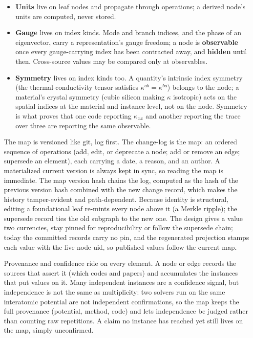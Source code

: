 \documentclass[11pt,a4paper]{article}
\begin{document}
\begin{itemize}[leftmargin=2em]
  \item \textbf{Units} live on leaf nodes and propagate through operations; a derived
  node's units are computed, never stored.
  \item \textbf{Gauge} lives on index kinds. Mode and branch indices, and the phase of an
  eigenvector, carry a representation's gauge freedom; a node is \textbf{observable}
  once every gauge-carrying index has been contracted away, and \textbf{hidden}
  until then. Cross-source values may be compared only at observables.
  \item \textbf{Symmetry} lives on index kinds too. A quantity's intrinsic index symmetry
  (the thermal-conductivity tensor satisfies $\kappa^{ab} = \kappa^{ba}$) belongs to
  the node; a material's crystal symmetry (cubic silicon making $\kappa$ isotropic)
  acts on the spatial indices at the material and instance level, not on the
  node. Symmetry is what proves that one code reporting $\kappa_{xx}$ and another
  reporting the trace over three are reporting the same observable.
\end{itemize}

The map is versioned like git, log first. The change-log is the map: an ordered
sequence of operations (add, edit, or deprecate a node; add or remove an edge;
supersede an element), each carrying a date, a reason, and an author. A
materialized current version is always kept in sync, so reading the map is
immediate. The map version hash chains the log, computed as the hash of the
previous version hash combined with the new change record, which makes the
history tamper-evident and path-dependent. Because identity is structural,
editing a foundational leaf re-mints every node above it (a Merkle ripple); the
supersede record ties the old subgraph to the new one. The design gives a
value two currencies, stay pinned for reproducibility or follow the supersede
chain; today the committed records carry no pin, and the regenerated
projection stamps each value with the live node uid, so published values
follow the current map.

Provenance and confidence ride on every element. A node or edge records the
sources that assert it (which codes and papers) and accumulates the instances
that put values on it. Many independent instances are a confidence signal, but
independence is not the same as multiplicity: two solvers run on the same
interatomic potential are not independent confirmations, so the map keeps the
full provenance (potential, method, code) and lets independence be judged rather
than counting raw repetitions. A claim no instance has reached yet still lives
on the map, simply unconfirmed.
\end{document}
